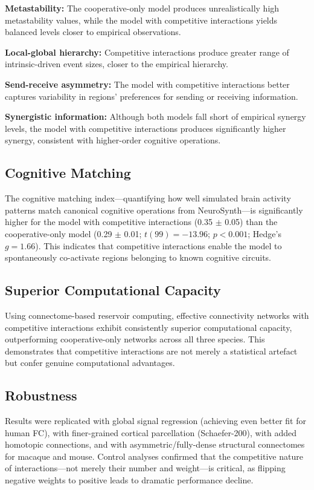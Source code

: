\documentclass[11pt]{article}
\begin{document}
\textbf{Metastability:} The cooperative-only model produces unrealistically high metastability values, while the model with competitive interactions yields balanced levels closer to empirical observations.

\textbf{Local-global hierarchy:} Competitive interactions produce greater range of intrinsic-driven event sizes, closer to the empirical hierarchy.

\textbf{Send-receive asymmetry:} The model with competitive interactions better captures variability in regions' preferences for sending or receiving information.

\textbf{Synergistic information:} Although both models fall short of empirical synergy levels, the model with competitive interactions produces significantly higher synergy, consistent with higher-order cognitive operations.

\subsection{Cognitive Matching}

The cognitive matching index---quantifying how well simulated brain activity patterns match canonical cognitive operations from NeuroSynth---is significantly higher for the model with competitive interactions (0.35 $\pm$ 0.05) than the cooperative-only model (0.29 $\pm$ 0.01; $t(99) = -13.96$; $p < 0.001$; Hedge's $g = 1.66$). This indicates that competitive interactions enable the model to spontaneously co-activate regions belonging to known cognitive circuits.

\subsection{Superior Computational Capacity}

Using connectome-based reservoir computing, effective connectivity networks with competitive interactions exhibit consistently superior computational capacity, outperforming cooperative-only networks across all three species. This demonstrates that competitive interactions are not merely a statistical artefact but confer genuine computational advantages.

\subsection{Robustness}

Results were replicated with global signal regression (achieving even better fit for human FC), with finer-grained cortical parcellation (Schaefer-200), with added homotopic connections, and with asymmetric/fully-dense structural connectomes for macaque and mouse. Control analyses confirmed that the competitive nature of interactions---not merely their number and weight---is critical, as flipping negative weights to positive leads to dramatic performance decline.
\end{document}
